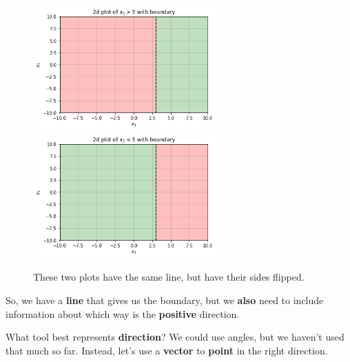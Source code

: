         \begin{figure}[H]
                \includegraphics[width=70mm,scale=0.5]{images/classification_images/x1_2d_plot_boundary.png}
                \includegraphics[width=70mm,scale=0.5]{images/classification_images/x1_2d_plot_boundary_reversed.png}
                
                \caption*{These two plots have the same line, but have their sides flipped.}
        \end{figure}
        
        So, we have a \textbf{line} that gives us the boundary, but we \textbf{also} need to include information about which way is the \textbf{positive} direction.
        
        What tool best represents \textbf{direction}? We could use angles, but we haven't used that much so far. Instead, let's use a \textbf{vector} to \textbf{point} in the right direction.
        
